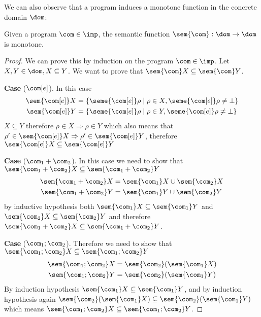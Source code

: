 We can also observe that a program induces a monotone function in the
concrete domain \(\dom\):

\begin{lemma}
  Given a program \(\com\in\imp\), the semantic function
  \(\sem{\com} : \dom \to \dom\) is monotone.
\end{lemma}

\begin{proof}
  We can prove this by induction on the program \(\com\in\imp\). Let
  \(X, Y\in\dom, X \subseteq Y\). We want to prove that
  \(\sem{\com}X \subseteq \sem{\com}Y\).

  \medskip

  \noindent
  \textbf{Case} (\(\com[e]\)). In this case
  \begin{align*}
    \sem{\com[e]}X & = \{\seme{\com[e]}\rho \mid \rho \in X , \seme{\com[e]}\rho \neq \bot\} \\
    \sem{\com[e]}Y & = \{\seme{\com[e]}\rho \mid \rho \in Y , \seme{\com[e]}\rho \neq \bot\}
  \end{align*}
  \(X\subseteq Y\) therefore \(\rho \in X \Rightarrow \rho \in Y\)
  which also means that
  \(\rho' \in \sem{\com[e]}X \Rightarrow \rho' \in \sem{\com[e]}Y\),
  therefore \(\sem{\com[e]}X \subseteq \sem{\com[e]}Y\)

  \medskip

  \noindent
  \textbf{Case} (\(\com_1 + \com_2\)). In this case we need
  to show that \(\sem{\com_1+\com_2}X \subseteq \sem{\com_1+\com_2}Y \)
  \begin{align*}
    \sem{\com_1 + \com_2}X & = \sem{\com_1}X \cup \sem{\com_2}X \\
    \sem{\com_1 + \com_2}Y & = \sem{\com_1}Y \cup \sem{\com_2}Y
  \end{align*}
  by inductive hypothesis both
  \(\sem{\com_1}X \subseteq \sem{\com_1}Y\) and
  \(\sem{\com_2}X \subseteq \sem{\com_2}Y\) and therefore
  \(\sem{\com_1 + \com_2}X \subseteq \sem{\com_1 + \com_2}Y\).

  \medskip

  \noindent
  \textbf{Case} (\(\com_1 ; \com_2\)). Therefore we need to show that
  \(\sem{\com_1;\com_2}X \subseteq \sem{\com_1;\com_2}Y \)
  \begin{align*}
    \sem{\com_1 ; \com_2}X & = \sem{\com_2}(\sem{\com_1}X) \\
    \sem{\com_1 ; \com_2}Y & = \sem{\com_2}(\sem{\com_1}Y)
  \end{align*}
  By induction hypothesis
  \(\sem{\com_1} X \subseteq \sem{\com_1}Y\), and by induction
  hypothesis again
  \(\sem{\com_2}(\sem{\com_1} X) \subseteq \sem{\com_2}(\sem{\com_1}
  Y)\) which means
  \(\sem{\com_1 ; \com_2} X \subseteq \sem{\com_1 ; \com_2}Y\).


\end{proof}
